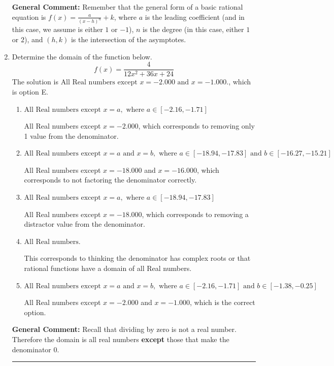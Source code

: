 \documentclass{extbook}[14pt]
\newcommand{\litem}[1]{\item #1

\rule{\textwidth}{0.4pt}}
\begin{document}
\begin{enumerate}
{\textbf{General Comment:} Remember that the general form of a basic rational equation is $ f(x) = \frac{a}{(x-h)^n} + k$, where $a$ is the leading coefficient (and in this case, we assume is either $1$ or $-1$), $n$ is the degree (in this case, either $1$ or $2$), and $(h, k)$ is the intersection of the asymptotes.
}
\litem{
Determine the domain of the function below.
\[ f(x) = \frac{4}{12x^{2} +36 x + 24} \]The solution is \( \text{All Real numbers except } x = -2.000 \text{ and } x = -1.000. \), which is option E.\begin{enumerate}[label=\Alph*.]
\item \( \text{All Real numbers except } x = a, \text{ where } a \in [-2.16, -1.71] \)

All Real numbers except $x = -2.000$, which corresponds to removing only 1 value from the denominator.
\item \( \text{All Real numbers except } x = a \text{ and } x = b, \text{ where } a \in [-18.94, -17.83] \text{ and } b \in [-16.27, -15.21] \)

All Real numbers except $x = -18.000$ and $x = -16.000$, which corresponds to not factoring the denominator correctly.
\item \( \text{All Real numbers except } x = a, \text{ where } a \in [-18.94, -17.83] \)

All Real numbers except $x = -18.000$, which corresponds to removing a distractor value from the denominator.
\item \( \text{All Real numbers.} \)

This corresponds to thinking the denominator has complex roots or that rational functions have a domain of all Real numbers.
\item \( \text{All Real numbers except } x = a \text{ and } x = b, \text{ where } a \in [-2.16, -1.71] \text{ and } b \in [-1.38, -0.25] \)

All Real numbers except $x = -2.000$ and $x = -1.000$, which is the correct option.
\end{enumerate}

\textbf{General Comment:} Recall that dividing by zero is not a real number. Therefore the domain is all real numbers \textbf{except} those that make the denominator 0.
}
\end{enumerate}
\end{document}
